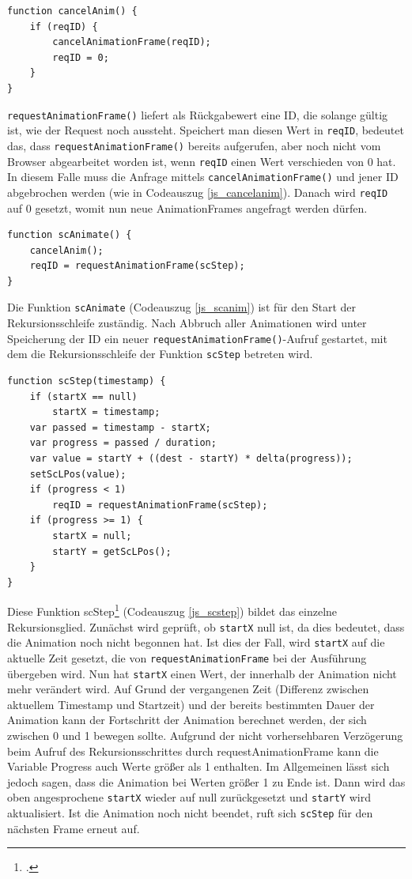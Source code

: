 \begin{lstlisting}[caption=Die Funktion cancelAnim., label=js_cancelanim]
function cancelAnim() {
	if (reqID) {
		cancelAnimationFrame(reqID);
		reqID = 0;
	}
}
\end{lstlisting}

\lstinline{requestAnimationFrame()} liefert als Rückgabewert eine ID, die solange gültig ist, wie der Request noch aussteht. Speichert man diesen Wert in \lstinline{reqID}, bedeutet das, dass \lstinline{requestAnimationFrame()} bereits aufgerufen, aber noch nicht vom Browser abgearbeitet worden ist, wenn \lstinline{reqID} einen Wert verschieden von 0 hat. In diesem Falle muss die Anfrage mittels \lstinline{cancelAnimationFrame()} und jener ID abgebrochen werden (wie in Codeauszug \ref{js_cancelanim}). Danach wird \lstinline{reqID} auf 0 gesetzt, womit nun neue AnimationFrames angefragt werden dürfen.

\begin{lstlisting}[caption=Die Funktion scAnim., label=js_scanim]
function scAnimate() {
	cancelAnim();
	reqID = requestAnimationFrame(scStep);
}
\end{lstlisting}

Die Funktion \lstinline{scAnimate} (Codeauszug \ref{js_scanim}) ist für den Start der Rekursionsschleife zuständig. Nach Abbruch aller Animationen wird unter Speicherung der ID ein neuer \lstinline{requestAnimationFrame()}-Aufruf gestartet, mit dem die Rekursionsschleife der Funktion \lstinline{scStep} betreten wird.

\begin{lstlisting}[caption=Die Funktion scStep., label=js_scstep]
function scStep(timestamp) {
	if (startX == null)
		startX = timestamp;
	var passed = timestamp - startX;
	var progress = passed / duration;
	var value = startY + ((dest - startY) * delta(progress));
	setScLPos(value);
	if (progress < 1)
		reqID = requestAnimationFrame(scStep);
	if (progress >= 1) {
		startX = null;
		startY = getScLPos();
	}
}
\end{lstlisting}

Diese Funktion scStep\footcite[vgl.][]{rAF} (Codeauszug \ref{js_scstep}) bildet das einzelne Rekursionsglied. Zunächst wird geprüft, ob \lstinline{startX} null ist, da dies bedeutet, dass die Animation noch nicht begonnen hat. Ist dies der Fall, wird \lstinline{startX} auf die aktuelle Zeit gesetzt, die von \lstinline{requestAnimationFrame} bei der Ausführung übergeben wird. Nun hat \lstinline{startX} einen Wert, der innerhalb der Animation nicht mehr verändert wird. Auf Grund der vergangenen Zeit (Differenz zwischen aktuellem Timestamp und Startzeit) und der bereits bestimmten Dauer der Animation kann der Fortschritt der Animation berechnet werden, der sich zwischen 0 und 1 bewegen sollte. Aufgrund der nicht vorhersehbaren Verzögerung beim Aufruf des Rekursionsschrittes durch requestAnimationFrame kann die Variable Progress auch Werte größer als 1 enthalten. Im Allgemeinen lässt sich jedoch sagen, dass die Animation bei Werten größer 1 zu Ende ist. Dann wird das oben angesprochene \lstinline{startX} wieder auf null zurückgesetzt und \lstinline{startY} wird aktualisiert. Ist die Animation noch nicht beendet, ruft sich \lstinline{scStep} für den nächsten Frame erneut auf.

